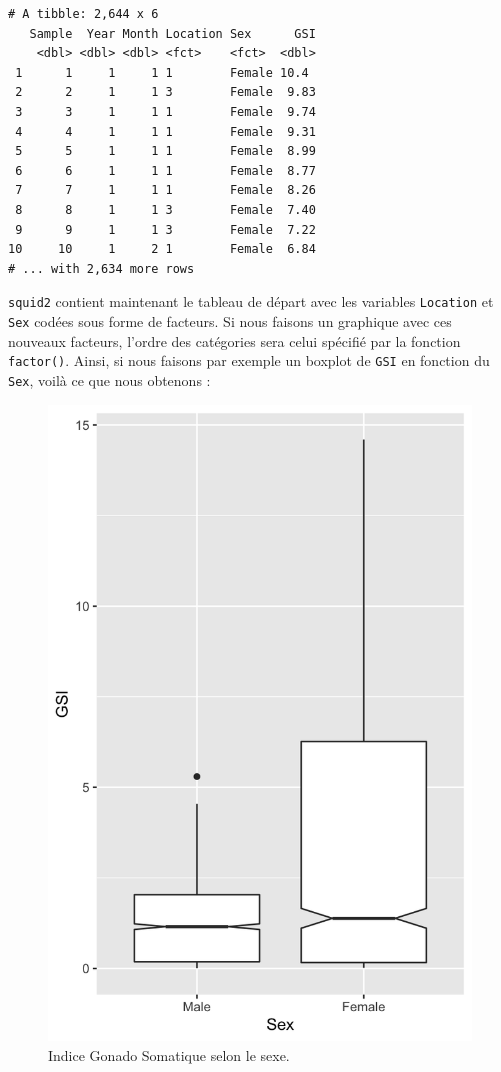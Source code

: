 \documentclass[a4paperpaper,]{article}
\newenvironment{Shaded}{\begin{snugshade}}{\end{snugshade}}
\newcommand{\DataTypeTok}[1]{\textcolor[rgb]{0.00,0.34,0.68}{#1}}
\newcommand{\KeywordTok}[1]{\textcolor[rgb]{0.12,0.11,0.11}{\textbf{#1}}}
\newcommand{\NormalTok}[1]{\textcolor[rgb]{0.12,0.11,0.11}{#1}}
\newcommand{\OperatorTok}[1]{\textcolor[rgb]{0.12,0.11,0.11}{#1}}
\newcommand{\OtherTok}[1]{\textcolor[rgb]{0.00,0.43,0.16}{#1}}
\newcommand{\StringTok}[1]{\textcolor[rgb]{0.75,0.01,0.01}{#1}}
\begin{document}
\begin{verbatim}
# A tibble: 2,644 x 6
   Sample  Year Month Location Sex      GSI
    <dbl> <dbl> <dbl> <fct>    <fct>  <dbl>
 1      1     1     1 1        Female 10.4 
 2      2     1     1 3        Female  9.83
 3      3     1     1 1        Female  9.74
 4      4     1     1 1        Female  9.31
 5      5     1     1 1        Female  8.99
 6      6     1     1 1        Female  8.77
 7      7     1     1 1        Female  8.26
 8      8     1     1 3        Female  7.40
 9      9     1     1 3        Female  7.22
10     10     1     2 1        Female  6.84
# ... with 2,634 more rows
\end{verbatim}

\texttt{squid2} contient maintenant le tableau de départ avec les variables \texttt{Location} et \texttt{Sex} codées sous forme de facteurs. Si nous faisons un graphique avec ces nouveaux facteurs, l'ordre des catégories sera celui spécifié par la fonction \texttt{factor()}. Ainsi, si nous faisons par exemple un boxplot de \texttt{GSI} en fonction du \texttt{Sex}, voilà ce que nous obtenons :

\begin{Shaded}
\end{Shaded}

\begin{figure}[htpb]

{\centering \includegraphics[width=0.5\linewidth]{figure/unnamed-chunk-136-1} 

}

\caption{Indice Gonado Somatique  selon le sexe.}\label{fig:unnamed-chunk-136}
\end{figure}
\end{document}
